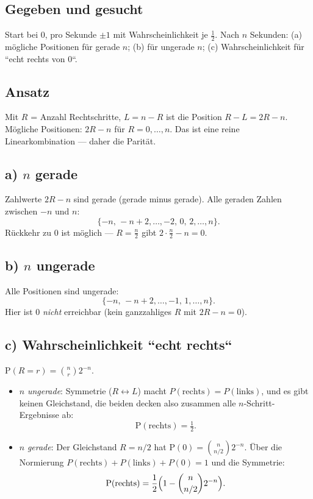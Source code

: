 

\subsection*{Gegeben und gesucht}
Start bei $0$, pro Sekunde $\pm1$ mit Wahrscheinlichkeit je $\tfrac12$.
Nach $n$ Sekunden: (a) mögliche Positionen für gerade $n$; (b) für
ungerade $n$; (c) Wahrscheinlichkeit für ``echt rechts von $0$``.

\subsection*{Ansatz}
Mit $R$ = Anzahl Rechtschritte, $L=n-R$ ist die Position $R-L=2R-n$.
Mögliche Positionen: $2R-n$ für $R=0,\dots,n$. Das ist eine reine
Linearkombination --- daher die Parität.

\subsection*{a) $n$ gerade}
Zahlwerte $2R-n$ sind gerade (gerade minus gerade). Alle geraden Zahlen
zwischen $-n$ und $n$:
\begin{equation}
  \{-n,\,-n+2,\dots,-2,\,0,\,2,\dots,n\} .
\end{equation}
Rückkehr zu $0$ ist möglich --- $R=\tfrac n2$ gibt $2\cdot\tfrac n2-n=0$.
\checkmark

\subsection*{b) $n$ ungerade}
Alle Positionen sind ungerade:
\begin{equation}
  \{-n,\,-n+2,\dots,-1,\,1,\dots,n\} .
\end{equation}
Hier ist $0$ \emph{nicht} erreichbar (kein ganzzahliges $R$ mit
$2R-n=0$).

\subsection*{c) Wahrscheinlichkeit ``echt rechts``}
$\mathrm P(R=r)=\binom{n}{r}2^{-n}$.
\begin{itemize}
  \item $n$ \emph{ungerade}: Symmetrie ($R\leftrightarrow L$) macht
        $P(\text{rechts})=P(\text{links})$, und es gibt keinen
        Gleichstand, die beiden decken also zusammen alle $n$-Schritt-
        Ergebnisse ab:
        \begin{equation}
          \mathrm P(\text{rechts})=\tfrac12 .
        \end{equation}
  \item $n$ \emph{gerade}: Der Gleichstand $R=n/2$ hat
        $\mathrm P(0)=\binom{n}{n/2}2^{-n}$. Über die Normierung
        $P(\text{rechts})+P(\text{links})+P(0)=1$ und die Symmetrie:
        \begin{equation}
          \mathrm P(\text{rechts})=\frac12\Bigl(1-\binom{n}{n/2}2^{-n}\Bigr).
        \end{equation}
\end{itemize}

